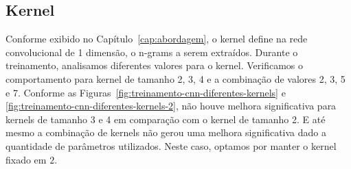 \subsection{Kernel}

Conforme exibido no Capítulo~\ref{cap:abordagem}, o kernel define na rede convolucional de 1 dimensão, o n-grams a serem extraídos. Durante o treinamento, analisamos diferentes valores para o kernel. Verificamos o comportamento para kernel de tamanho 2, 3, 4 e a combinação de valores 2, 3, 5 e 7. Conforme as Figuras~\ref{fig:treinamento-cnn-diferentes-kernels} e \ref{fig:treinamento-cnn-diferentes-kernels-2}, não houve melhora significativa para kernels de tamanho 3 e 4 em comparação com o kernel de tamanho 2. E até mesmo a combinação de kernels não gerou uma melhora significativa dado a quantidade de parâmetros utilizados. Neste caso, optamos por manter o kernel fixado em $2$.


